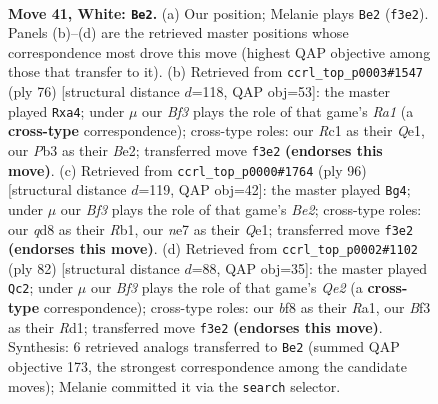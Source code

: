 \documentclass[11pt]{article}
\begin{document}
\clearpage

\begin{figure}[p]\centering
\begin{subfigure}{0.46\textwidth}\centering
\resizebox{\linewidth}{!}{%
\newchessgame
\chessboard[
  setfen={1n1qkb1r/4n3/r1p3p1/3p2P1/3P1PNp/1P3B1P/1B1Q3R/2R3K1 w - - 11 41},
  showmover=false,
  pgfstyle=straightmove, color=movearrow, markmove={f3-e2}
]}
\caption{}
\end{subfigure}\hfill
\begin{subfigure}{0.46\textwidth}\centering
\resizebox{\linewidth}{!}{%
\newchessgame
\chessboard[
  setfen={r1br3k/4qppp/p2n4/2NPp3/pP2P3/3R3P/4B1P1/R3Q1K1 w - - 0 39},
  showmover=false,
  pgfstyle=straightmove, color=movearrow, markmove={a1-a4}
]}
\caption{}
\end{subfigure}
\\[4pt]
\begin{subfigure}{0.46\textwidth}\centering
\resizebox{\linewidth}{!}{%
\newchessgame
\chessboard[
  setfen={3r2k1/5pb1/1pq1n1pp/3pP3/2p2P2/4P2P/4B1PK/1R2QR2 w - - 0 49},
  showmover=false,
  pgfstyle=straightmove, color=movearrow, markmove={e2-g4}
]}
\caption{}
\end{subfigure}\hfill
\begin{subfigure}{0.46\textwidth}\centering
\resizebox{\linewidth}{!}{%
\newchessgame
\chessboard[
  setfen={1r2n3/2qn1pk1/4r1p1/2p1p2p/2N1P2P/2P3P1/4QPK1/R2R1B2 w - - 3 42},
  showmover=false,
  pgfstyle=straightmove, color=movearrow, markmove={e2-c2}
]}
\caption{}
\end{subfigure}
\caption{\textbf{Move 41, White: \texttt{Be2}.} (a) Our position; Melanie plays \texttt{Be2} (\texttt{f3e2}). Panels (b)--(d) are the retrieved master positions whose correspondence most drove this move (highest QAP objective among those that transfer to it). (b) Retrieved from \texttt{ccrl\_top\_p0003\#1547} (ply 76) [structural distance $d$=118, QAP obj=53]: the master played \texttt{Rxa4}; under $\mu$ our \emph{Bf3} plays the role of that game's \emph{Ra1} (a \textbf{cross-type} correspondence); cross-type roles: our \emph{R}c1 as their \emph{Q}e1, our \emph{P}b3 as their \emph{B}e2; transferred move \texttt{f3e2} \textbf{(endorses this move)}. (c) Retrieved from \texttt{ccrl\_top\_p0000\#1764} (ply 96) [structural distance $d$=119, QAP obj=42]: the master played \texttt{Bg4}; under $\mu$ our \emph{Bf3} plays the role of that game's \emph{Be2}; cross-type roles: our \emph{q}d8 as their \emph{R}b1, our \emph{n}e7 as their \emph{Q}e1; transferred move \texttt{f3e2} \textbf{(endorses this move)}. (d) Retrieved from \texttt{ccrl\_top\_p0002\#1102} (ply 82) [structural distance $d$=88, QAP obj=35]: the master played \texttt{Qc2}; under $\mu$ our \emph{Bf3} plays the role of that game's \emph{Qe2} (a \textbf{cross-type} correspondence); cross-type roles: our \emph{b}f8 as their \emph{R}a1, our \emph{B}f3 as their \emph{R}d1; transferred move \texttt{f3e2} \textbf{(endorses this move)}. Synthesis: 6 retrieved analogs transferred to \texttt{Be2} (summed QAP objective 173, the strongest correspondence among the candidate moves); Melanie committed it via the \texttt{search} selector.}
\label{fig:thought-m80}
\end{figure}
\end{document}
